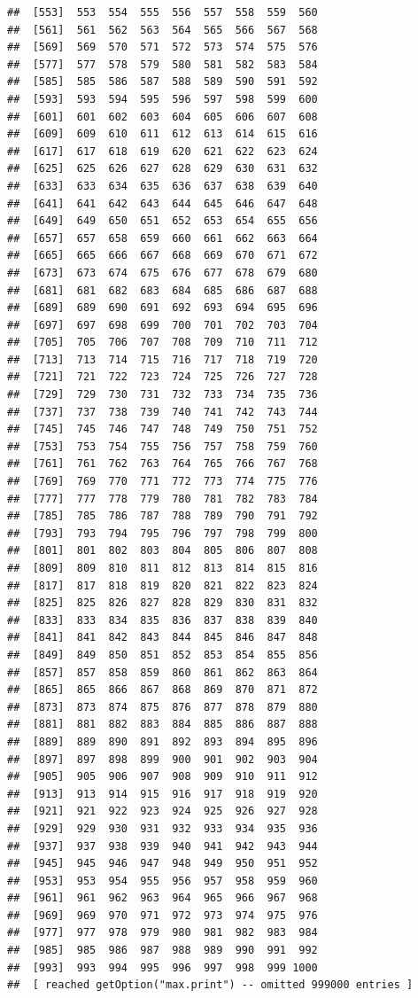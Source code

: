 \documentclass[
]{book}
\begin{document}
\begin{verbatim}
##  [553]  553  554  555  556  557  558  559  560
##  [561]  561  562  563  564  565  566  567  568
##  [569]  569  570  571  572  573  574  575  576
##  [577]  577  578  579  580  581  582  583  584
##  [585]  585  586  587  588  589  590  591  592
##  [593]  593  594  595  596  597  598  599  600
##  [601]  601  602  603  604  605  606  607  608
##  [609]  609  610  611  612  613  614  615  616
##  [617]  617  618  619  620  621  622  623  624
##  [625]  625  626  627  628  629  630  631  632
##  [633]  633  634  635  636  637  638  639  640
##  [641]  641  642  643  644  645  646  647  648
##  [649]  649  650  651  652  653  654  655  656
##  [657]  657  658  659  660  661  662  663  664
##  [665]  665  666  667  668  669  670  671  672
##  [673]  673  674  675  676  677  678  679  680
##  [681]  681  682  683  684  685  686  687  688
##  [689]  689  690  691  692  693  694  695  696
##  [697]  697  698  699  700  701  702  703  704
##  [705]  705  706  707  708  709  710  711  712
##  [713]  713  714  715  716  717  718  719  720
##  [721]  721  722  723  724  725  726  727  728
##  [729]  729  730  731  732  733  734  735  736
##  [737]  737  738  739  740  741  742  743  744
##  [745]  745  746  747  748  749  750  751  752
##  [753]  753  754  755  756  757  758  759  760
##  [761]  761  762  763  764  765  766  767  768
##  [769]  769  770  771  772  773  774  775  776
##  [777]  777  778  779  780  781  782  783  784
##  [785]  785  786  787  788  789  790  791  792
##  [793]  793  794  795  796  797  798  799  800
##  [801]  801  802  803  804  805  806  807  808
##  [809]  809  810  811  812  813  814  815  816
##  [817]  817  818  819  820  821  822  823  824
##  [825]  825  826  827  828  829  830  831  832
##  [833]  833  834  835  836  837  838  839  840
##  [841]  841  842  843  844  845  846  847  848
##  [849]  849  850  851  852  853  854  855  856
##  [857]  857  858  859  860  861  862  863  864
##  [865]  865  866  867  868  869  870  871  872
##  [873]  873  874  875  876  877  878  879  880
##  [881]  881  882  883  884  885  886  887  888
##  [889]  889  890  891  892  893  894  895  896
##  [897]  897  898  899  900  901  902  903  904
##  [905]  905  906  907  908  909  910  911  912
##  [913]  913  914  915  916  917  918  919  920
##  [921]  921  922  923  924  925  926  927  928
##  [929]  929  930  931  932  933  934  935  936
##  [937]  937  938  939  940  941  942  943  944
##  [945]  945  946  947  948  949  950  951  952
##  [953]  953  954  955  956  957  958  959  960
##  [961]  961  962  963  964  965  966  967  968
##  [969]  969  970  971  972  973  974  975  976
##  [977]  977  978  979  980  981  982  983  984
##  [985]  985  986  987  988  989  990  991  992
##  [993]  993  994  995  996  997  998  999 1000
##  [ reached getOption("max.print") -- omitted 999000 entries ]
\end{verbatim}
\end{document}

